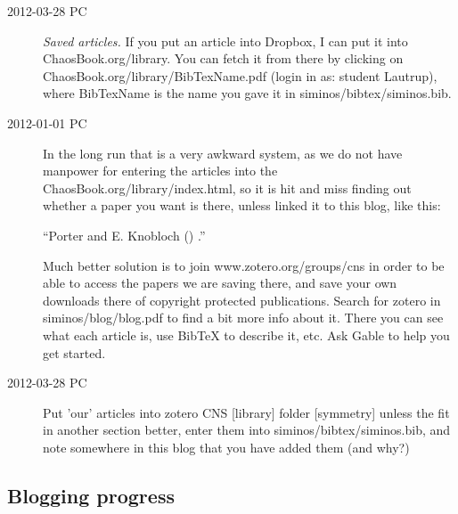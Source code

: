 \begin{description}

\item[2012-03-28 PC] \emph{Saved articles.} If you put an article into
Dropbox, I can put it into 
{ChaosBook.org/library}. You can fetch it from there by clicking on
ChaosBook.org/library/BibTexName.pdf (login in as: student Lautrup),
where BibTexName is the name you gave it in siminos/bibtex/siminos.bib.

\item[2012-01-01 PC] In the long run that is a very awkward system, as we
do not have manpower for entering the articles into the
ChaosBook.org/library/index.html, so it is hit and miss finding out
whether a paper you want is there, unless linked it to this blog, like
this:

``Porter and E. Knobloch
()
.''

Much better solution is to join 
{www.zotero.org/groups/cns} in order to be able to access the papers we
are saving there, and save your own downloads there of copyright
protected publications. Search for zotero in siminos/blog/blog.pdf to
find a bit more info about it. There you can see what each article is,
use BibTeX to describe it, etc. Ask Gable to help you get started.

\item[2012-03-28 PC]
Put 'our' articles into zotero CNS [library] folder [symmetry] unless the
fit in another section better, enter them into
siminos/bibtex/siminos.bib, and note somewhere in this blog that you have
added them (and why?)

\end{description}



\subsection{Blogging {\twoMode} progress}
\label{chap:2modesBlog}


